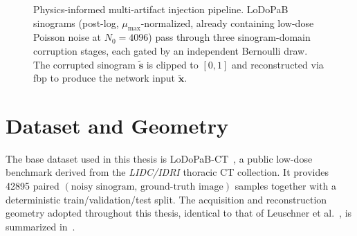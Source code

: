 \begin{figure}[!htb]
    \caption[Physics-informed multi-artifact injection pipeline.]{%
        Physics-informed multi-artifact injection pipeline. \mbox{LoDoPaB} sinograms (post-log,
        $\mu_{\max}$-normalized, already containing low-dose Poisson noise at $N_0{=}4096$) pass through three
        sinogram-domain corruption stages, each gated by an independent Bernoulli draw. The corrupted sinogram
        $\tilde{\mathbf{s}}$ is clipped to $[0,1]$ and reconstructed via \gls{fbp} to produce the network input $\tilde{\mathbf{x}}$.}
    \label{fig:meth_pipeline}
\end{figure}

\section{Dataset and Geometry}
\label{sec:meth_dataset}

The base dataset used in this thesis is \mbox{LoDoPaB-CT}~\cite{Leuschner2021}, a public low-dose benchmark derived from the \emph{LIDC/IDRI} thoracic CT collection. It provides \num{42895} paired $(\text{noisy sinogram},\,\text{ground-truth image})$ samples together with a deterministic train/validation/test split. The acquisition and reconstruction geometry adopted throughout this thesis, identical to that of Leuschner et al.~\cite{Leuschner2021}, is summarized in~.

